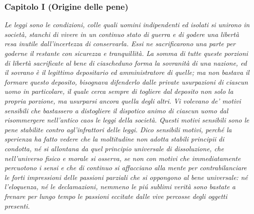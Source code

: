 \documentclass{article}
\begin{document}
\newpage
\subsubsection{Capitolo I (Origine delle pene)}
{\itshape Le leggi sono le condizioni, colle quali uomini indipendenti ed isolati si unirono in
società, stanchi di vivere in un continuo stato di guerra e di godere una libertà resa inutile
dall’incertezza di conservarla. Essi ne sacrificarono una parte per goderne
il restante con sicurezza e tranquillità. La somma di tutte queste porzioni di 
libertà sacrificate al bene di ciascheduno forma la sovranità di una nazione, ed il 
sovrano è il legittimo depositario ed amministratore di quelle; ma non bastava il 
formare questo deposito, bisognava difenderlo dalle private usurpazioni di 
ciascun uomo in particolare, il quale cerca sempre di togliere dal deposito non solo la 
propria porzione, ma usurparsi ancora quella degli altri. Vi volevano de’ motivi sensibili 
che bastassero a distogliere il dispotico animo di ciascun uomo dal risommergere 
nell’antico caos le leggi della società. Questi motivi sensibili sono le pene stabilite 
contro agl’infrattori delle leggi. Dico sensibili motivi, perché la sperienza ha fatto 
vedere che la moltitudine non adotta stabili principii di condotta, né si allontana 
da quel principio universale di dissoluzione, che nell’universo fisico e morale si 
osserva, se non con motivi che immediatamente percuotono i sensi e che di continuo si 
affacciano alla mente per contrabilanciare le forti impressioni delle passioni 
parziali che si oppongono al bene universale: né l’eloquenza, né le declamazioni, 
nemmeno le piú sublimi verità sono bastate a frenare per lungo tempo le passioni eccitate 
dalle vive percosse degli oggetti presenti.} 
\end{document}
